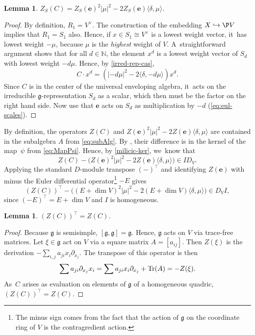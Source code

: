 \documentclass[JEP,XML,SOM,Unicode,published]{cedram}
\newcommand\hto{\mathrel{\lhook\joinrel\to}}
\newcommand{\bme}{{\boldsymbol{e}}}
\newtheorem{lem}[thm]{Lemma}
\newcommand{\frg}{\mathfrak{g}}
\DeclareMathOperator{\Tr}{\textup{Tr}}
\begin{document}
\begin{lem}\label{C-vs-e-on-S}
$Z_S(C) = Z_S(\bme)^2|\mu|^2 - 2Z_S(\bme)\langle\delta,\mu\rangle$.
\end{lem}

\begin{proof}
By definition, $R_1=V^\vee$. The construction of the embedding $X\hto \P V$ implies that $R_1=S_1$ also. Hence, if $x\in S_1\cong V^\vee$ is a
lowest weight vector, it~has
lowest weight $-\mu$, because $\mu$ is the \emph{highest} weight of $V$. A~straightforward argument shows that for all $d\in \mathbb{N}$, the element $x^d$ is a
lowest weight vector of $S_d$ with
lowest weight $-d\mu$.
Hence, by \cref{irred-rep-cas},
\[
C\cdot x^d = (|-d\mu|^2 - 2\langle\delta, -d\mu\rangle)x^d.
\]
Since $C$ is in the center of the universal enveloping algebra, it~acts on the irreducible $\frg$-representation $S_d$ as a scalar, which then must be the factor on the right hand side. Now use that $\bme$ acts on $S_d$ as multiplication by $-d$ (\cref{eq:eul-scales}).
\end{proof}

By definition, the operators $Z(C)$ and $Z(\bme)^2|\mu|^2 - 2Z(\bme)\langle\delta,\mu\rangle$ are contained in the subalgebra $A$ from \eqref{eq:subAlg}. By , their difference is in the kernel of the map~$\psi$ from \eqref{eq:MapPsi}. Hence, by \cref{milicic-ker}, we~know that
\[
Z(C) - \bigl(Z(\bme)^2|\mu|^2 - 2Z(\bme)\langle\delta,\mu\rangle\bigr) \in I D_V.
\]
Applying the standard $D$\nobreakdash-mod\-ule transpose $(-)^\top$ and identifying $Z(\bme)$ with minus the Euler differential operator\footnote{The minus sign comes from the fact that the action of $\mathfrak{g}$ on the coordinate ring of $V$ is the contragredient action.} $-E$ gives\vspace*{-3pt}
\begin{equation}\label{eq:ZZtop}
(Z(C))^\top - \bigl((E+\dim{V})^2|\mu|^2 - 2(E+\dim{V})\langle\delta,\mu\rangle\bigr)\in D_V I,
\end{equation}
since $(-E)^\top=E+\dim V$ and $I$ is homogeneous.

\begin{lem}\label{ZZtop}
$(Z(C))^\top = Z(C)$.
\end{lem}

\begin{proof}
Because $\frg$ is semisimple, $[\frg,\frg]=\frg$. Hence, $\frg$ acts on $V$ via trace-free matrices. Let $\xi\in \frg$ act on $V$ via a square matrix $A=[a_{ij}]$. Then $Z(\xi)$ is the derivation $-\sum_{i,j}a_{ji}x_i\partial_{x_j}$. The transpose of this operator is then\vspace*{-3pt}
\[
\sum a_{ji}\partial_{x_j} x_i = \sum a_{ji} x_i \partial_{x_j} +\Tr(A) = -Z(\xi).
\]
As~$C$ arises as evaluation on elements of $\frg$ of a homogeneous quadric, $(Z(C))^\top=Z(C)$.
\end{proof}
\end{document}
